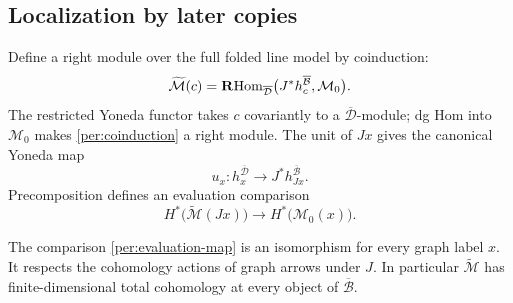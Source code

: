 \subsection{Localization by later copies}

Define a right module over the full folded line model by coinduction:
\begin{equation}
 \widetilde{\mathcal M}(c)
   =\operatorname{\mathbf R Hom}_{\overline{\mathcal D}}
       \bigl(J^*h_c^{\overline{\mathcal B}},\mathcal M_0\bigr).
 \label{per:coinduction}
\end{equation}
The restricted Yoneda functor takes $c$ covariantly to a
$\overline{\mathcal D}$-module; dg Hom into $\mathcal M_0$ makes
\eqref{per:coinduction} a right module.  The unit of $Jx$ gives the
canonical Yoneda map
\[
 u_x:h_x^{\overline{\mathcal D}}\longrightarrow
                  J^*h_{Jx}^{\overline{\mathcal B}}.
\]
Precomposition defines an evaluation comparison
\begin{equation}
 H^*\bigl(\widetilde{\mathcal M}(Jx)\bigr)
       \longrightarrow H^*\bigl(\mathcal M_0(x)\bigr).
 \label{per:evaluation-map}
\end{equation}

\begin{proposition}
\label{per:localization}
The comparison \eqref{per:evaluation-map} is an isomorphism for every
graph label $x$.  It respects the cohomology actions of graph arrows
under $J$.  In particular $\widetilde{\mathcal M}$ has finite-dimensional
total cohomology at every object of $\overline{\mathcal B}$.
\end{proposition}

